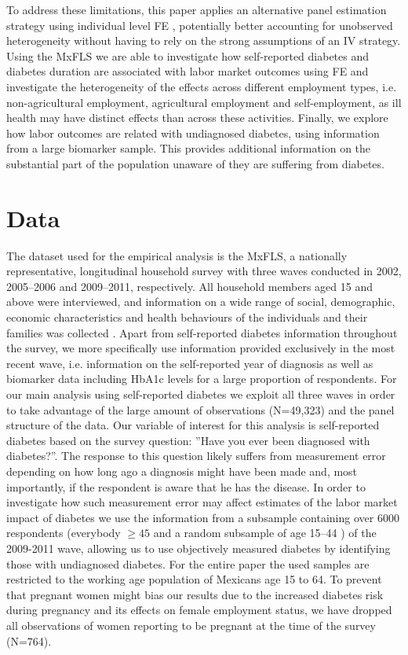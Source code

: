 \documentclass[12pt,english,british]{article}
\begin{document}
To address these limitations, this paper applies an alternative panel estimation strategy using individual level \ac{FE} , potentially better accounting for unobserved heterogeneity without having to rely on the strong assumptions of an \ac{IV} strategy. Using the \ac{MxFLS} we are able to investigate
how self-reported diabetes and diabetes duration are associated with
labor market outcomes using \ac{FE} and investigate the heterogeneity
of the effects across different employment types, i.e.
non-agricultural employment, agricultural employment and self-employment, as ill health may have distinct effects than across these activities. Finally, we explore how labor outcomes are related with undiagnosed diabetes, using information from a large biomarker sample. This provides additional information on the substantial part of the
population unaware of they are suffering from diabetes.

\section{\label{sec:Data}Data}

The dataset used for the empirical analysis is the \acf{MxFLS},
a nationally representative, longitudinal household survey with three
waves conducted in 2002, 2005--2006 and 2009--2011, respectively.
All household members aged 15 and above were interviewed, and information
on a wide range of social, demographic, economic characteristics and
health behaviours of the individuals and their families was collected
\citep{Rubalcava2013}. Apart from self-reported diabetes information
throughout the survey, we more specifically use information provided exclusively in the most recent wave, i.e. information
on the self-reported year of diagnosis as well as biomarker data including \ac{HbA1c} levels for a large proportion of respondents.  For our main analysis using self-reported diabetes we exploit all three waves in order to
take advantage of the large amount of observations (N=49,323) and the panel structure
of the data. Our variable of interest for this analysis is self-reported
diabetes based on the survey question: ''Have you
ever been diagnosed with diabetes?''. The response to this question
likely suffers from measurement error depending on how long ago a diagnosis
might have been made and, most importantly, if the respondent is aware
that he has the disease. In order to investigate how such measurement
error may affect estimates of the labor market impact of diabetes
we use the information from a subsample containing over 6000 respondents (everybody $\geq 45$ and a random subsample of age 15--44 \citep{Crimmins2015}) of the 2009-2011 wave, allowing us to use objectively measured diabetes by identifying those with undiagnosed diabetes. For the entire paper the used samples are restricted to the working age population of Mexicans age 15 to 64. To prevent that pregnant women might bias our results due to the increased diabetes risk during pregnancy and its effects on female employment status, we have dropped all observations of women reporting to be pregnant at the time of the survey (N=764).
\end{document}
